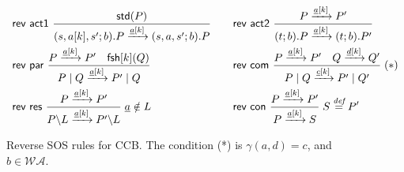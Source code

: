 \documentclass[runningheads]{llncs}
\newcommand{\Rule}[2]{\displaystyle{\frac{#1}{#2}}}
\newcommand{\paral}{\; \vert \;}
\newcommand{\mA}{\mathcal{A}}
\newcommand{\mAK}{\mathcal{AK}}
\newcommand{\rom}[1]{\mbox{\rm{#1}}}
\newcommand{\std}[1]{\mathsf{std}(#1)}
\newcommand{\fresh}[2]{\mathsf{fsh}[#1](#2)}
\newcommand{\bydef}{\stackrel{\emph{def}}{=}}
\newcommand{\rulename}[1]{\textsf{#1}}
\begin{document}
\begin{figure}
\vspace{-8ex}\[
\begin{array}{ll}
\rulename{rev act1}\
\Rule
{\std{P} %
}
{(s,a[k],s';b).P \xrightarrow{\underline{a}[k]}(s,a,s';b).P}
\quad &
%
%
%
\rulename{rev act2}\
\Rule
{P \xrightarrow{\underline{a}[k]} P' %
}
{(t;b).P \xrightarrow{\underline{a}[k]} (t;b).P'}
\\[15pt]
\rulename{rev par}\
\Rule
{P \xrightarrow{\underline{a}[k]} P'\quad \fresh{k}{Q}}
{P \paral Q \xrightarrow{\underline{a}[k]} P' \paral Q}
\quad &
\rulename{rev com}\
\Rule
{P \xrightarrow{\underline{a}[k]} P' \quad Q \xrightarrow{\underline{d}[k]} Q'}
{P \paral Q \xrightarrow{\underline{c}[k]} P' \paral Q'}
\; (*)
%
\\[15pt]
\rulename{rev res}\
\Rule
{P \xrightarrow{\underline{a}[k]} P'}
{P\backslash L \xrightarrow{\underline{a}[k]} P'\backslash L}
\; \underline{a} \notin L
\quad &
\rulename{rev con}\
\Rule
{P \xrightarrow{\underline{a}[k]} P'}
{P \xrightarrow{\underline{a}[k]} S}
\; S \bydef P'
\end{array}
\]
\vspace{-4ex}\caption[Reverse SOS rules for CCB.]{Reverse SOS rules for CCB. The condition (*) is $\gamma(a,d)=c$, and $b \in \mathcal{WA}$. %
} 
\label{fig:reversesos}
\vspace{-2ex}\end{figure}
\end{document}
